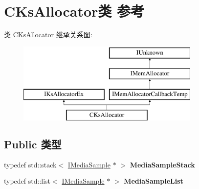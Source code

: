 \hypertarget{class_c_ks_allocator}{}\section{C\+Ks\+Allocator类 参考}
\label{class_c_ks_allocator}
类 C\+Ks\+Allocator 继承关系图\+:\begin{figure}[H]
\begin{center}
\leavevmode
\includegraphics[height=4.000000cm]{class_c_ks_allocator}
\end{center}
\end{figure}
\subsection*{Public 类型}
\begin{DoxyCompactItemize}
\item 
\mbox{\label{class_c_ks_allocator_a51e4800f23f78c75f525f1a1b4a30f09}} 
typedef std\+::stack$<$ \hyperlink{interface_i_media_sample}{I\+Media\+Sample} $\ast$ $>$ {\bfseries Media\+Sample\+Stack}
\item 
\mbox{\label{class_c_ks_allocator_a85f4cd53f546741bec894cf7419994af}} 
typedef std\+::list$<$ \hyperlink{interface_i_media_sample}{I\+Media\+Sample} $\ast$ $>$ {\bfseries Media\+Sample\+List}
\end{DoxyCompactItemize}
